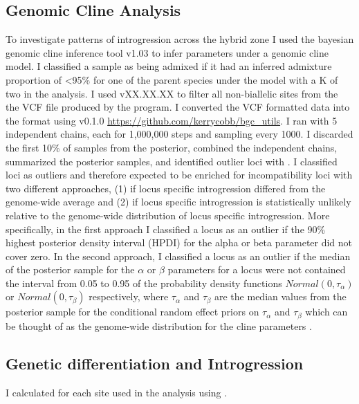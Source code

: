 \subsection{Genomic Cline Analysis}
To investigate patterns of introgression across the hybrid zone I     
used the bayesian genomic cline inference tool \bgc v1.03 \parencite{gompert2012} 
to infer parameters under a genomic cline model.
I classified a sample as being admixed if it had an inferred admixture proportion
of <95\% for one of the parent species under the model with a K of two in 
the \structure analysis.
I used \vcftools vXX.XX.XX to filter all non-biallelic sites from the the VCF file 
produced by the \populations program. 
I converted the VCF formatted data into the \bgc format using \bgcutils v0.1.0 
\url{https://github.com/kerrycobb/bgc_utils}.
I ran \bgc with 5 independent chains, each for 1,000,000 steps and sampling every 1000.
I discarded the first 10\% of samples from the posterior, combined the independent 
chains, summarized the posterior samples, and identified outlier loci with \bgcutils. 
I classified loci as outliers and therefore expected to be enriched for 
incompatibility loci with two different approaches, (1) if locus specific 
introgression differed from the genome-wide average and (2) if locus specific 
introgression is statistically unlikely relative to the genome-wide distribution
of locus specific introgression. 
More specifically, in the first approach I classified a locus as an outlier 
if the 90\% highest posterior density interval (HPDI) for the alpha or beta 
parameter did not cover zero.
In the second approach, I classified a locus as an outlier if the median of the  
posterior sample for the $\alpha$ or $\beta$ parameters for a locus were not contained 
the interval from 0.05 to 0.95 of the probability density functions $Normal(0, \tau_\alpha)$  
or $Normal(0, \tau_\beta)$ respectively, where $\tau_\alpha$ and $\tau_\beta$ are  
the median values from the posterior sample for  the conditional random effect 
priors on $\tau_\alpha$ and $\tau_\beta$ which can be thought of as the genome-wide
distribution for the cline parameters \parencite{gompert2011}.



\subsection{Genetic differentiation and Introgression}
I calculated \fst for each site used in the \bgc analysis using \vcftools \parencite{danecek2011}. 



